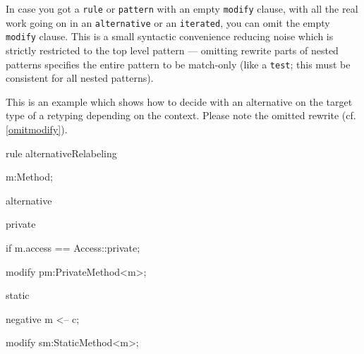 \begin{note} \label{omitmodify}
In case you got a \texttt{rule} or \texttt{pattern} with an empty \texttt{modify} clause, with all the real work going on in an \texttt{alternative} or an \texttt{iterated}, you can omit the empty \texttt{modify} clause.
This is a small syntactic convenience reducing noise which is strictly restricted to the top level pattern --- omitting rewrite parts of nested patterns specifies the entire pattern to be match-only (like a \texttt{test}; this must be consistent for all nested patterns).
\end{note}

\begin{example}
This is an example which shows how to decide with an alternative on the target type of a retyping depending on the context.
Please note the omitted rewrite (cf. \ref{omitmodify}).

  \begin{grgen}
rule alternativeRelabeling
{
  m:Method;
  
  alternative {
    private {
      if { m.access == Access::private; }

      modify {
        pm:PrivateMethod<m>;
      }
    }
    static {
      negative {
        m <-- c;
      }

      modify {
        sm:StaticMethod<m>;
      }
    }
  } 
}
  \end{grgen}
\end{example}
